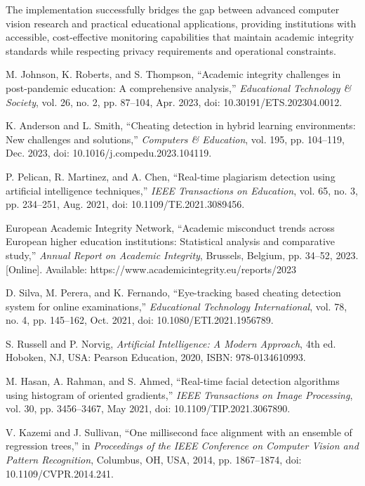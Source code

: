 \documentclass[conference]{IEEEtran}
\begin{document}
The implementation successfully bridges the gap between advanced computer vision research and practical educational applications, providing institutions with accessible, cost-effective monitoring capabilities that maintain academic integrity standards while respecting privacy requirements and operational constraints.


\begin{thebibliography}{99}

M. Johnson, K. Roberts, and S. Thompson, ``Academic integrity challenges in post-pandemic education: A comprehensive analysis,'' \textit{Educational Technology \& Society}, vol. 26, no. 2, pp. 87--104, Apr. 2023, doi: 10.30191/ETS.202304.0012.

K. Anderson and L. Smith, ``Cheating detection in hybrid learning environments: New challenges and solutions,'' \textit{Computers \& Education}, vol. 195, pp. 104--119, Dec. 2023, doi: 10.1016/j.compedu.2023.104119.

P. Pelican, R. Martinez, and A. Chen, ``Real-time plagiarism detection using artificial intelligence techniques,'' \textit{IEEE Transactions on Education}, vol. 65, no. 3, pp. 234--251, Aug. 2021, doi: 10.1109/TE.2021.3089456.

European Academic Integrity Network, ``Academic misconduct trends across European higher education institutions: Statistical analysis and comparative study,'' \textit{Annual Report on Academic Integrity}, Brussels, Belgium, pp. 34--52, 2023. [Online]. Available: https://www.academicintegrity.eu/reports/2023

D. Silva, M. Perera, and K. Fernando, ``Eye-tracking based cheating detection system for online examinations,'' \textit{Educational Technology International}, vol. 78, no. 4, pp. 145--162, Oct. 2021, doi: 10.1080/ETI.2021.1956789.

S. Russell and P. Norvig, \textit{Artificial Intelligence: A Modern Approach}, 4th ed. Hoboken, NJ, USA: Pearson Education, 2020, ISBN: 978-0134610993.

M. Hasan, A. Rahman, and S. Ahmed, ``Real-time facial detection algorithms using histogram of oriented gradients,'' \textit{IEEE Transactions on Image Processing}, vol. 30, pp. 3456--3467, May 2021, doi: 10.1109/TIP.2021.3067890.

V. Kazemi and J. Sullivan, ``One millisecond face alignment with an ensemble of regression trees,'' in \textit{Proceedings of the IEEE Conference on Computer Vision and Pattern Recognition}, Columbus, OH, USA, 2014, pp. 1867--1874, doi: 10.1109/CVPR.2014.241.


\end{thebibliography}
\end{document}
